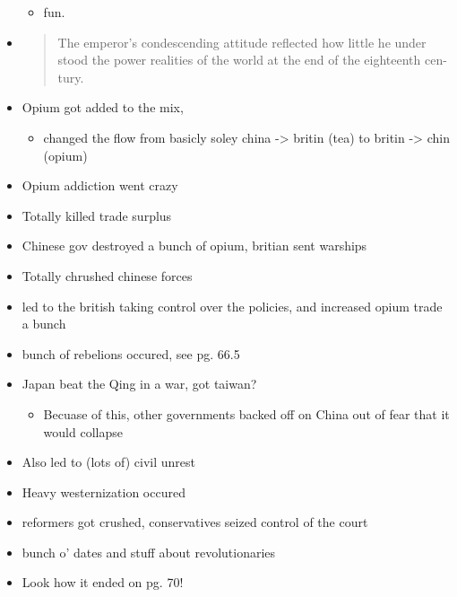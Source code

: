 \documentclass[letterpaper]{article}
\begin{document}
\begin{itemize}
\begin{itemize}
\item fun.
\end{itemize}

\item \begin{quote}
The emperor's condescending attitude reflected how little he under
stood the power realities of the world at the end of the eighteenth
cen- tury.
\end{quote}

\item Opium got added to the mix,

\begin{itemize}
\item changed the flow from basicly soley china -> britin (tea) to britin
-> chin (opium)
\end{itemize}

\item Opium addiction went crazy

\item Totally killed trade surplus

\item Chinese gov destroyed a bunch of opium, britian sent warships

\item Totally chrushed chinese forces

\item led to the british taking control over the policies, and increased
opium trade a bunch

\item bunch of rebelions occured, see pg. 66.5

\item Japan beat the Qing in a war, got taiwan?

\begin{itemize}
\item Becuase of this, other governments backed off on China out of fear
that it would collapse
\end{itemize}

\item Also led to (lots of) civil unrest

\item Heavy westernization occured

\item reformers got crushed, conservatives seized control of the court

\item bunch o' dates and stuff about revolutionaries

\item Look how it ended on pg. 70!
\end{itemize}
\end{document}
